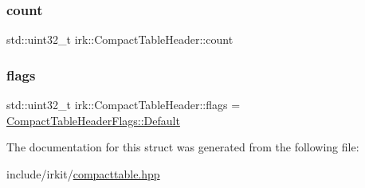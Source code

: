\subsubsection{\texorpdfstring{count}{count}}
{\footnotesize\ttfamily std\+::uint32\+\_\+t irk\+::\+Compact\+Table\+Header\+::count}

\mbox{\label{structirk_1_1CompactTableHeader_a2c71419d0680d872ae53eb578151d3b0}} 
\subsubsection{\texorpdfstring{flags}{flags}}
{\footnotesize\ttfamily std\+::uint32\+\_\+t irk\+::\+Compact\+Table\+Header\+::flags = \mbox{\hyperlink{structirk_1_1CompactTableHeaderFlags_a18debbc227dbcb7726817a08b541e5e0}{Compact\+Table\+Header\+Flags\+::\+Default}}}



The documentation for this struct was generated from the following file\+:\begin{DoxyCompactItemize}
\item 
include/irkit/\mbox{\hyperlink{compacttable_8hpp}{compacttable.\+hpp}}\end{DoxyCompactItemize}
